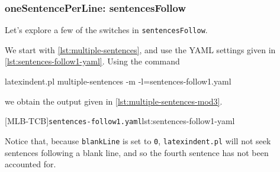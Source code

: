 \documentclass[10pt]{article}
\begin{document}
\subsubsection{oneSentencePerLine: sentencesFollow}
 Let's explore a few of the switches in \texttt{sentencesFollow}.

 \begin{example}
 We start with \vref{lst:multiple-sentences}, and use the YAML settings given in
 \cref{lst:sentences-follow1-yaml}. Using the command 
  

 \begin{commandshell}
latexindent.pl multiple-sentences -m -l=sentences-follow1.yaml
\end{commandshell}

 we obtain the output given in \cref{lst:multiple-sentences-mod3}.

 \begin{cmhtcbraster}
  [MLB-TCB]{\texttt{sentences-follow1.yaml}}{lst:sentences-follow1-yaml}
 \end{cmhtcbraster}

 Notice that, because \texttt{blankLine} is set to \texttt{0}, \texttt{latexindent.pl}
 will not seek sentences following a blank line, and so the fourth sentence has not been
 accounted for.
 \end{example}
\end{document}
